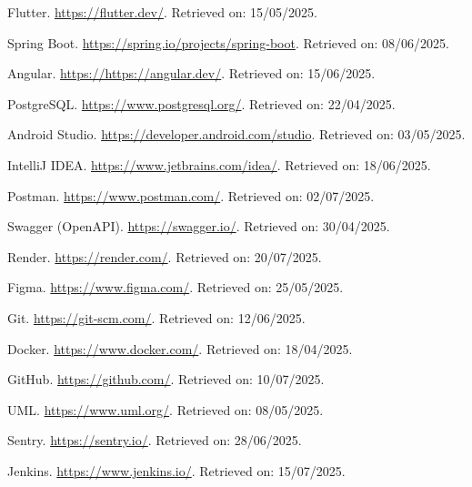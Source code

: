 \adjustmtc
\renewcommand\bibname{Webliography}
\begin{thebibliography}{}

Flutter. \url{https://flutter.dev/}. Retrieved on: 15/05/2025.

Spring Boot. \url{https://spring.io/projects/spring-boot}. Retrieved on: 08/06/2025.

Angular. \url{https://https://angular.dev/}. Retrieved on: 15/06/2025.

PostgreSQL. \url{https://www.postgresql.org/}. Retrieved on: 22/04/2025.

Android Studio. \url{https://developer.android.com/studio}. Retrieved on: 03/05/2025.

IntelliJ IDEA. \url{https://www.jetbrains.com/idea/}. Retrieved on: 18/06/2025.

Postman. \url{https://www.postman.com/}. Retrieved on: 02/07/2025.

Swagger (OpenAPI). \url{https://swagger.io/}. Retrieved on: 30/04/2025.

Render. \url{https://render.com/}. Retrieved on: 20/07/2025.

Figma. \url{https://www.figma.com/}. Retrieved on: 25/05/2025.

Git. \url{https://git-scm.com/}. Retrieved on: 12/06/2025.

Docker. \url{https://www.docker.com/}. Retrieved on: 18/04/2025.

GitHub. \url{https://github.com/}. Retrieved on: 10/07/2025.

UML. \url{https://www.uml.org/}. Retrieved on: 08/05/2025.

Sentry. \url{https://sentry.io/}. Retrieved on: 28/06/2025.

Jenkins. \url{https://www.jenkins.io/}. Retrieved on: 15/07/2025.

\end{thebibliography}
